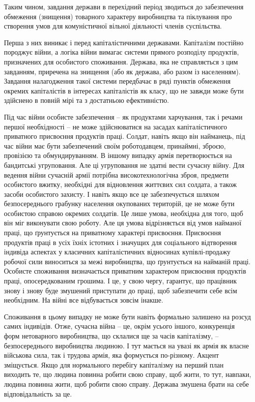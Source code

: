 \documentclass[12pt,a4paper,openany]{book}
\begin{document}
Таким чином, завдання держави в перехідний період зводиться до забезпечення обмеження (знищення) товарного характеру виробництва та піклування про створення умов для комуністичної вільної діяльності членів суспільства.

Перша з них виникає і перед капіталістичними державами. Капіталізм постійно породжує війни, а логіка війни вимагає системи прямого розподілу продуктів, призначених для особистого споживання. Держава, яка не справляється з цим завданням, приречена на знищення (або як держава, або разом із населенням). Завдання налагодження такої системи передбачає в ряді пунктів обмеження окремих капіталістів в інтересах капіталістів як класу, що не завжди може бути здійснено в повній мірі та з достатньою ефективністю.

Під час війни особисте забезпечення – як продуктами харчування, так і речами першої необхідності – не може здійснюватися на засадах капіталістичного приватного присвоєння продуктів праці. Солдат, навіть якщо він найманець, під час війни має бути забезпечений своїм роботодавцем, принаймні, зброєю, провізією та обмундируванням. В іншому випадку армія перетворюється на бандитські угруповання. Але ці угруповання не здатні вести сучасну війну. Для ведення війни сучасній армії потрібна високотехнологічна зброя, предмети особистого вжитку, необхідні для відновлення життєвих сил солдата, а також засоби особистого захисту. І навіть якщо все це забезпечується шляхом безпосереднього грабунку населення окупованих територій, це не може бути особистою справою окремих солдатів. Це лише умова, необхідна для того, щоб він міг виконувати свою роботу. Але ця умова відрізняється від умов найманої праці, що ґрунтується на приватному характері присвоєння. Присвоєння продуктів праці в усіх їхніх істотних і значущих для соціального відтворення індивіда аспектах у класичних капіталістичних відносинах купівлі-продажу робочої сили виноситься за межі виробництва, що ґрунтується на найманій праці. Особисте споживання визначається приватним характером присвоєння продуктів праці, опосередкованим грошима. І це, у свою чергу, гарантує, що працівник знову і знову буде змушений приступати до праці, щоб забезпечити себе всім необхідним. На війні все відбувається зовсім інакше.

Споживання в цьому випадку не може бути навіть формально залишено на розсуд самих індивідів. Отже, сучасна війна – це, окрім усього іншого, конкуренція форм нетоварного виробництва, що склалися ще за часів капіталізму, – безпосереднього виробництва людиною. І тут мається на увазі як армія як власне військова сила, так і трудова армія, яка формується по-різному. Акцент зміщується. Якщо для нормального перебігу капіталізму на перший план виходить те, що людина повинна робити свою справу, щоб жити, то тут, навпаки, людина повинна жити, щоб робити свою справу. Держава змушена брати на себе відповідальність за це.
\end{document}
